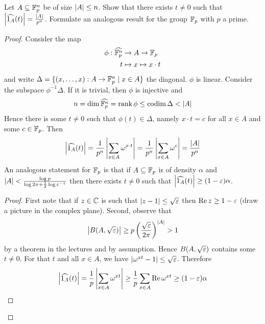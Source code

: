 \documentclass{article}
\begin{document}
\begin{problem}
  Let $A \subseteq \mathbb F_p^n$ be of size $\left\lvert A\right\rvert \le n$. Show that there exists $t \ne 0$ such that $\left\lvert \widehat{1_A}(t)\right\rvert = \frac{\left\lvert A\right\rvert}{p^n}$. Formulate an analogous result for the group $\mathbb F_p$ with $p$ a prime.
\end{problem}
\begin{proof}
  Consider the map
  \begin{align*}
    \phi : \widehat{\mathbb F_p^n} & \to A \to \mathbb F_p \\
    t & \mapsto x \mapsto x \cdot t
  \end{align*}
  and write $\Delta = \{(x, \dots, x) : A \to \mathbb F_p^n \mid x \in A\}$ the diagonal. $\phi$ is linear. Consider the subspace $\phi^{-1}\Delta$. If it is trivial, then $\phi$ is injective and
  $$n = \dim \widehat{\mathbb F_p^n} = \operatorname{rank} \phi \le \operatorname{codim} \Delta < \left\lvert A\right\rvert$$
  Hence there is some $t \ne 0$ such that $\phi(t) \in \Delta$, namely $x \cdot t = c$ for all $x \in A$ and some $c \in \mathbb F_p$. Then
  $$\left\lvert \widehat{1_A}(t)\right\rvert = \frac 1{p^n} \left\lvert \sum_{x \in A} \omega^{x \cdot t}\right\rvert = \frac 1{p^n} \left\lvert \sum_{x \in A} \omega^c\right\rvert = \frac{\left\lvert A\right\rvert}{p^n}$$
  An analogous statement for $\mathbb F_p$ is that if $A \subseteq \mathbb F_p$ is of density $\alpha$ and $\left\lvert A\right\rvert < \frac{\log p}{\log 2\pi + \frac 12\log \varepsilon^{-1}}$ then there exists $t \ne 0$ such that $\left\lvert \widehat{1_A}(t)\right\rvert \ge (1 - \varepsilon)\alpha$.
  \begin{proof}
    First note that if $z \in \mathbb C$ is such that $\left\lvert z - 1\right\rvert \le \sqrt{\varepsilon}$ then $\operatorname{Re} z \ge 1 - \varepsilon$ (draw a picture in the complex plane). Second, observe that
    $$\left\lvert B(A, \sqrt{\varepsilon})\right\rvert \ge p \left(\frac{\sqrt{\varepsilon}}{2\pi}\right)^{\left\lvert A\right\rvert} > 1$$
    by a theorem in the lectures and by assumption. Hence $B(A, \sqrt{\varepsilon})$ contains some $t \ne 0$. For that $t$ and all $x \in A$, we have $\left\lvert \omega^{xt} - 1\right\rvert \le \sqrt{\varepsilon}$. Therefore
    $$\left\lvert \widehat{1_A}(t)\right\rvert = \frac 1p \left\lvert \sum_{x \in A} \omega^{xt}\right\rvert \ge \frac 1p \sum_{x \in A} \operatorname{Re} \omega^{xt} \ge (1 - \varepsilon)\alpha$$
  \end{proof}
\end{proof}
\end{document}

